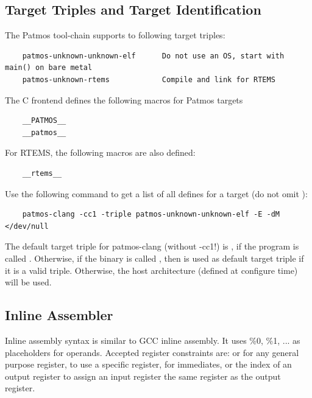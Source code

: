 \subsection{Target Triples and Target Identification}

The Patmos tool-chain supports to following target triples:

\begin{verbatim}
    patmos-unknown-unknown-elf      Do not use an OS, start with main() on bare metal
    patmos-unknown-rtems            Compile and link for RTEMS
\end{verbatim}

The C frontend defines the following macros for Patmos targets

\begin{verbatim}
    __PATMOS__
    __patmos__
\end{verbatim}

For RTEMS, the following macros are also defined:

\begin{verbatim}
    __rtems__
\end{verbatim}

Use the following command to get a list of all defines for a target (do not omit ):

\begin{verbatim}
    patmos-clang -cc1 -triple patmos-unknown-unknown-elf -E -dM </dev/null
\end{verbatim}

The default target triple for patmos-clang (without -cc1!) is ,
if the program is called . Otherwise, if the binary is called
, then  is used as default target triple if it is a valid triple.
Otherwise, the host architecture (defined at configure time) will be used.


\subsection{Inline Assembler}

Inline assembly syntax is similar to GCC inline assembly. It uses \%0, \%1, ... as placeholders for
operands. Accepted register constraints are:  or  for any general purpose register,
 to use a specific register,  for immediates, or the index of an output register to
assign an input register the same register as the output register.

